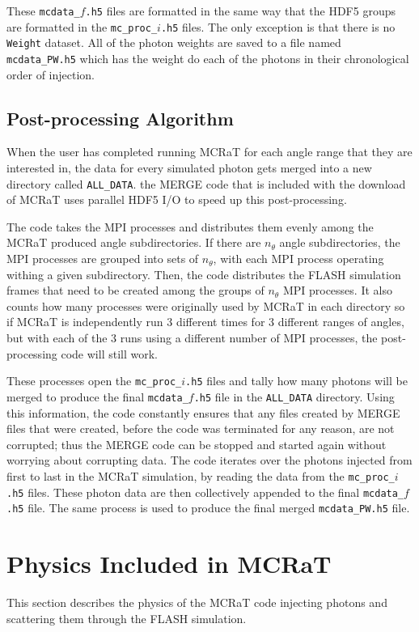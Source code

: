 \documentclass[12pt,a4paper]{article}
\begin{document}
These \texttt{mcdata\_$f$.h5} files are formatted in the same way that the HDF5 groups are formatted in the \texttt{mc\_proc\_$i$.h5} files. The only exception is that there is no \texttt{Weight} dataset. All of the photon weights are saved to a file named \texttt{mcdata\_PW.h5} which has the weight do each of the photons in their chronological order of injection.

\subsection{Post-processing Algorithm}
When the user has completed running MCRaT for each angle range that they are interested in, the data for every simulated photon gets merged into a new directory called \texttt{ALL\_DATA}. the MERGE code that is included with the download of MCRaT uses parallel HDF5 I/O to speed up this post-processing. 

The code takes the MPI processes and distributes them evenly among the MCRaT produced angle subdirectories. If there are $n_\theta$ angle subdirectories, the MPI processes are grouped into sets of $n_\theta$, with each MPI process operating withing a given subdirectory. Then, the code distributes the FLASH simulation frames that need to be created among the groups of $n_\theta$ MPI processes. It also counts how many processes were originally used by MCRaT in each directory so if MCRaT is independently run 3 different times for 3 different ranges of angles, but with each of the 3 runs using a different number of MPI processes, the post-processing code will still work.

These processes open the \texttt{mc\_proc\_$i$.h5} files and tally how many photons will be merged to produce the final \texttt{mcdata\_$f$.h5} file in the \texttt{ALL\_DATA} directory. Using this information, the code constantly ensures that any files created by MERGE files that were created, before the code was terminated for any reason, are not corrupted; thus the MERGE code can be stopped and started again without worrying about corrupting data. The code iterates over the photons injected from first to last in the MCRaT simulation, by reading the data from the \texttt{mc\_proc\_$i$.h5} files. These photon data are then collectively appended to the final \texttt{mcdata\_$f$.h5} file. The same process is used to produce the final merged \texttt{mcdata\_PW.h5} file.

\section{Physics Included in MCRaT}
This section describes the physics of the MCRaT code injecting photons and scattering them through the FLASH simulation.  
\end{document}
